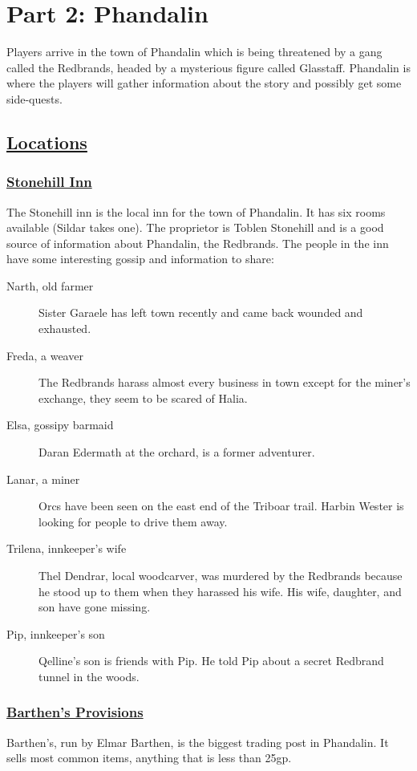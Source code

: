 \section{Part 2: Phandalin}
Players arrive in the town of Phandalin which is being threatened by a gang called the Redbrands, headed by a mysterious figure called Glasstaff. Phandalin is where the players will gather information about the story and possibly get some side-quests.

\subsection*{\underline{Locations}}

\subsubsection*{\underline{Stonehill Inn}}
The Stonehill inn is the local inn for the town of Phandalin. It has six rooms available (Sildar takes one). The proprietor is Toblen Stonehill and is a good source of information about Phandalin, the Redbrands. The people in the inn have some interesting gossip and information to share:

\begin{description}	
	\item[Narth, old farmer] Sister Garaele has left town recently and came back wounded and exhausted.
	\item[Freda, a weaver] The Redbrands harass almost every business in town except for the miner's exchange, they seem to be scared of Halia.
	\item[Elsa, gossipy barmaid] Daran Edermath at the orchard, is a former adventurer.
	\item[Lanar, a miner] Orcs have been seen on the east end of the Triboar trail. Harbin Wester is looking for people to drive them away.
	\item[Trilena, innkeeper's wife] Thel Dendrar, local woodcarver, was murdered by the Redbrands because he stood up to them when they harassed his wife. His wife, daughter, and son have gone missing.
	\item[Pip, innkeeper's son] Qelline's son is friends with Pip. He told Pip about a secret Redbrand tunnel in the woods.
\end{description}

\subsubsection*{\underline{Barthen's Provisions}}
Barthen's, run by Elmar Barthen, is the biggest trading post in Phandalin. It sells most common items, anything that is less than 25gp.

